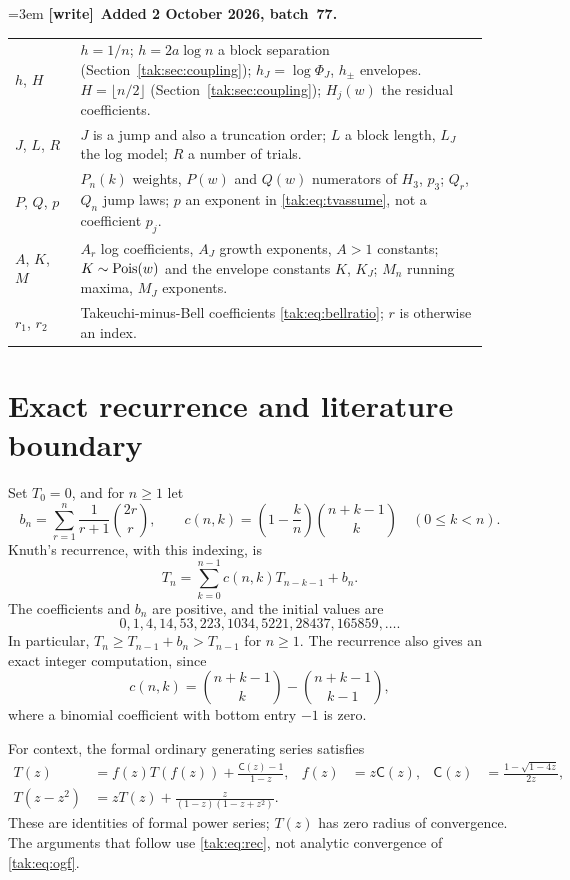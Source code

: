 \documentclass[11pt,letterpaper]{article}
\theoremstyle{remark}\newtheorem{remark}[theorem]{Remark}
\newenvironment{writenote}[1][]{\par\smallskip\begingroup\small\emergencystretch=3em
 \noindent\textbf{[write]}\if\relax\detokenize{#1}\relax\else~\textbf{#1.}\fi\ }%
 {\par\endgroup\smallskip}
\begin{document}
\begin{writenote}[Added 2 October 2026, batch~77]
\begin{center}
\begin{tabular}{@{}>{\raggedright\arraybackslash}p{0.13\linewidth}>{\raggedright\arraybackslash}p{0.81\linewidth}@{}}
$h$, $H$ & $h=1/n$; $h=2a\log n$ a block separation (Section~\ref{tak:sec:coupling}); $h_J=\log\Phi_J$, $h_\pm$ envelopes. $H=\lfloor n/2\rfloor$ (Section~\ref{tak:sec:coupling}); $H_j(w)$ the residual coefficients.\\
$J$, $L$, $R$ & $J$ is a jump and also a truncation order; $L$ a block length, $L_J$ the log model; $R$ a number of trials.\\
$P$, $Q$, $p$ & $P_n(k)$ weights, $P(w)$ and $Q(w)$ numerators of $H_3$, $p_3$; $Q_r$, $Q_n$ jump laws; $p$ an exponent in \eqref{tak:eq:tvassume}, not a coefficient $p_j$.\\
$A$, $K$, $M$ & $A_r$ log coefficients, $A_J$ growth exponents, $A>1$ constants; $K\sim\operatorname{Pois}(w)$ and the envelope constants $K$, $K_J$; $M_n$ running maxima, $M_J$ exponents.\\
$r_1$, $r_2$ & Takeuchi-minus-Bell coefficients \eqref{tak:eq:bellratio}; $r$ is otherwise an index.\\
\bottomrule
\end{tabular}
\end{center}
\end{writenote}

\section{Exact recurrence and literature boundary}\label{tak:sec:framework}
Set $T_0=0$, and for $n\geq1$ let
\begin{equation}
 b_n=\sum_{r=1}^n\frac1{r+1}\binom{2r}{r},\qquad
 c(n,k)=\left(1-\frac{k}{n}\right)\binom{n+k-1}{k}\quad(0\leq k<n).
\end{equation}
Knuth's recurrence, with this indexing, is
\begin{equation}
 T_n=\sum_{k=0}^{n-1}c(n,k)T_{n-k-1}+b_n.\label{tak:eq:rec}
\end{equation}
The coefficients and $b_n$ are positive, and the initial values are
\[
 0,1,4,14,53,223,1034,5221,28437,165859,\ldots.
\]
In particular, $T_n\geq T_{n-1}+b_n>T_{n-1}$ for $n\geq1$. The recurrence also gives an exact integer computation, since
\[
 c(n,k)=\binom{n+k-1}{k}-\binom{n+k-1}{k-1},
\]
where a binomial coefficient with bottom entry $-1$ is zero.

For context, the formal ordinary generating series satisfies
\begin{align}
 T(z)&=f(z)T(f(z))+\frac{\mathsf C(z)-1}{1-z}, &
 f(z)&=z\mathsf C(z), &\mathsf C(z)&=\frac{1-\sqrt{1-4z}}{2z},\label{tak:eq:ogf}\\
 T(z-z^2)&=zT(z)+\frac{z}{(1-z)(1-z+z^2)}.\nonumber
\end{align}
These are identities of formal power series; $T(z)$ has zero radius of convergence. The arguments that follow use \eqref{tak:eq:rec}, not analytic convergence of \eqref{tak:eq:ogf}.
\end{document}
